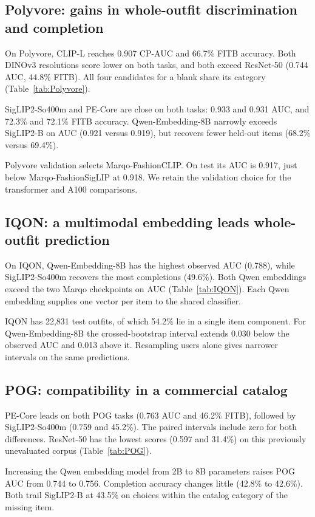 \subsection{Polyvore: gains in whole-outfit discrimination and completion}
\showPolyvore
On Polyvore, CLIP-L reaches 0.907 CP-AUC and 66.7\% FITB accuracy. Both DINOv3 resolutions score lower on both tasks, and both exceed ResNet-50 (0.744 AUC, 44.8\% FITB). All four candidates for a blank share its category (Table~\ref{tab:Polyvore}).

SigLIP2-So400m and PE-Core are close on both tasks: 0.933 and 0.931 AUC, and 72.3\% and 72.1\% FITB accuracy. Qwen-Embedding-8B narrowly exceeds SigLIP2-B on AUC (0.921 versus 0.919), but recovers fewer held-out items (68.2\% versus 69.4\%).

Polyvore validation selects Marqo-FashionCLIP. On test its AUC is 0.917, just below Marqo-FashionSigLIP at 0.918. We retain the validation choice for the transformer and A100 comparisons.

\subsection{IQON: a multimodal embedding leads whole-outfit prediction}
\showIQON
On IQON, Qwen-Embedding-8B has the highest observed AUC (0.788), while SigLIP2-So400m recovers the most completions (49.6\%). Both Qwen embeddings exceed the two Marqo checkpoints on AUC (Table~\ref{tab:IQON}). Each Qwen embedding supplies one vector per item to the shared classifier.

IQON has 22,831 test outfits, of which 54.2\% lie in a single item component. For Qwen-Embedding-8B the crossed-bootstrap interval extends 0.030 below the observed AUC and 0.013 above it. Resampling users alone gives narrower intervals on the same predictions.

\subsection{POG: compatibility in a commercial catalog}
\showPOG
PE-Core leads on both POG tasks (0.763 AUC and 46.2\% FITB), followed by SigLIP2-So400m (0.759 and 45.2\%). The paired intervals include zero for both differences. ResNet-50 has the lowest scores (0.597 and 31.4\%) on this previously unevaluated corpus (Table~\ref{tab:POG}).

Increasing the Qwen embedding model from 2B to 8B parameters raises POG AUC from 0.744 to 0.756. Completion accuracy changes little (42.8\% to 42.6\%). Both trail SigLIP2-B at 43.5\% on choices within the catalog category of the missing item.

